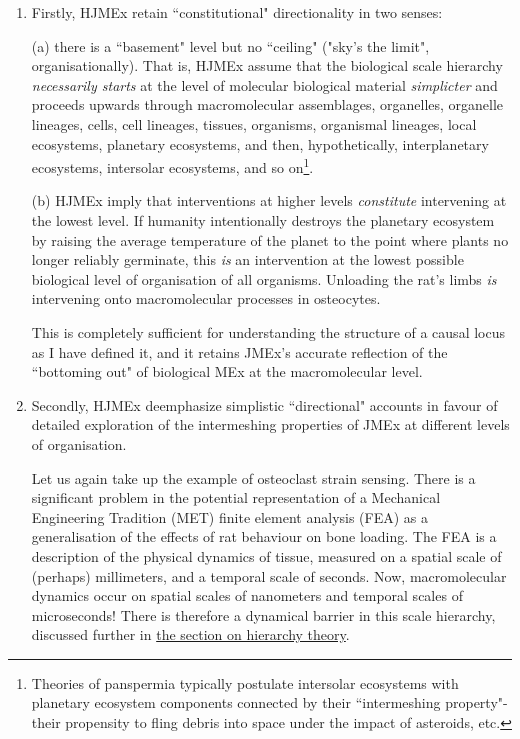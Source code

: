 \begin{enumerate}
 
\item Firstly, HJMEx retain ``constitutional" directionality in two senses:

(a) there is a ``basement" level but no ``ceiling" ("sky's the limit", organisationally). That is, HJMEx assume that the biological scale hierarchy \textit{necessarily starts} at the level of molecular biological material \textit{simplicter} and proceeds upwards through macromolecular assemblages, organelles, organelle lineages, cells, cell lineages, tissues, organisms, organismal lineages, local ecosystems, planetary ecosystems, and then, hypothetically, interplanetary ecosystems, intersolar ecosystems, and so on\footnote{Theories of panspermia typically postulate intersolar ecosystems with planetary ecosystem components connected by their ``intermeshing property"- their propensity to fling debris into space under the impact of asteroids, etc.}.

(b) HJMEx imply that interventions at higher levels \textit{constitute} intervening at the lowest level. If humanity intentionally destroys the planetary ecosystem by raising the average temperature of the planet to the point where plants no longer reliably germinate, this \textit{is} an intervention at the lowest possible biological level of organisation of all organisms. Unloading the rat's limbs \textit{is} intervening onto macromolecular processes in osteocytes.

 This is completely sufficient for understanding the structure of a causal locus as I have defined it, and it retains JMEx's accurate reflection of the ``bottoming out" of biological MEx at the macromolecular level.

 \item Secondly, HJMEx deemphasize simplistic ``directional" accounts in favour of detailed exploration of the intermeshing properties of JMEx at different levels of organisation.
 
 Let us again take up the example of osteoclast strain sensing. There is a significant problem in the potential representation of a Mechanical Engineering Tradition (MET) finite element analysis (FEA) as a generalisation of the effects of rat behaviour on bone loading. The FEA is a description of the physical dynamics of tissue, measured on a spatial scale of (perhaps) millimeters, and a temporal scale of seconds. Now, macromolecular dynamics occur on spatial scales of nanometers and temporal scales of microseconds! There is therefore a dynamical barrier in this scale hierarchy, discussed further in \hyperref[hierarchy]{the section on hierarchy theory}.
 

\end{enumerate}
